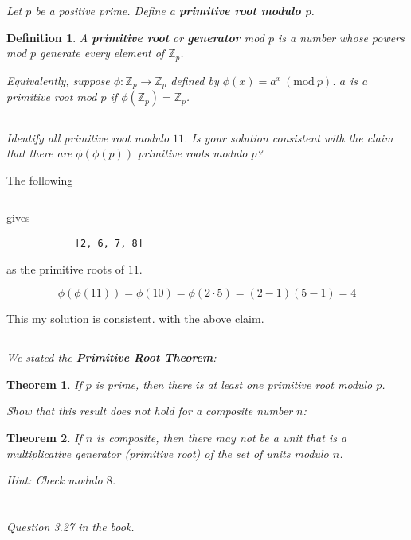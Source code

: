 \documentclass[12pt]{article}
\renewcommand{\mod}[1]{\mathrm{mod}\ #1}
\renewcommand{\pmod}[1]{\ (\mod{#1})}
\newcommand{\Z}{\mathbb{Z}}
\newtheorem*{defn}{Definition}
\newtheorem*{thm}{Theorem}
\begin{document}
\section{}
    \subsection{} \textit{Let $p$ be a positive prime. Define a \textbf{primitive root modulo $p$}.}

        \begin{defn}
            A \textbf{primitive root} or \textbf{generator} mod $p$ is a number whose powers mod $p$ generate every element of $\Z_p$.

            Equivalently, suppose $\phi : \Z_p \to \Z_p$ defined by $\phi(x) = a^x \pmod{p}$. $a$ is a primitive root mod $p$ if $\phi(\Z_p) = \Z_p$.
        \end{defn}
    \subsection{} \textit{Identify all primitive root modulo $11$. Is your solution consistent with the claim that there are $\phi(\phi(p))$ primitive roots modulo $p$?}

        The following
        \inputminted{python}{hw2_6.py}
        gives
        \begin{verbatim}
            [2, 6, 7, 8]
        \end{verbatim}
        as the primitive roots of $11$.

        $$\phi(\phi(11)) = \phi(10) = \phi(2 \cdot 5) = (2 - 1)(5 - 1) = 4$$

        This my solution is consistent. with the above claim.
    \subsection{} \textit{We stated the \textbf{Primitive Root Theorem}:}

        \begin{thm}
            If $p$ is prime, then there is at least one primitive root modulo $p$.
        \end{thm}

        \textit{Show that this result does not hold for a composite number $n$:}

        \begin{thm}
            If $n$ is composite, then there may not be a unit that is a multiplicative generator (primitive root) of the set of units modulo $n$.
        \end{thm}

        \textit{Hint: Check modulo $8$.}

\section{} \textit{Question 3.27 in the book.}
\end{document}
